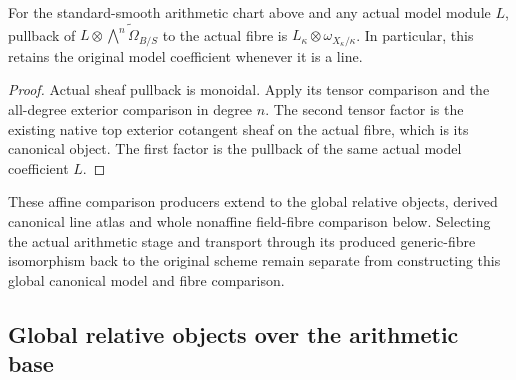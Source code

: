 \begin{theorem}
\label{thm:kn-arithmetic-canonical-twist-fibre}
\leanok
{}
For the standard-smooth arithmetic chart above and any actual model module $L$,
pullback of $L\otimes\widetilde{\bigwedge^n\Omega_{B/S}}$ to the actual fibre
is $L_\kappa\otimes\omega_{X_\kappa/\kappa}$.  In particular, this retains
the original model coefficient whenever it is a line.
\end{theorem}
\begin{proof}
Actual sheaf pullback is monoidal.  Apply its tensor comparison and the
all-degree exterior comparison in degree $n$.  The second tensor factor is
the existing native top exterior cotangent sheaf on the actual fibre, which
is its canonical object.  The first factor is the pullback of the same actual
model coefficient $L$.
\end{proof}

These affine comparison producers extend to the global relative objects,
derived canonical line atlas and whole nonaffine field-fibre comparison
below.  Selecting the actual arithmetic stage and transport through its
produced generic-fibre isomorphism back to the original scheme remain
separate from constructing this global canonical model and fibre comparison.

\subsection{Global relative objects over the arithmetic base}

